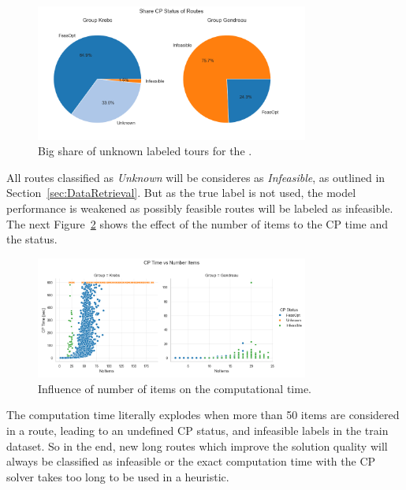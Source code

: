 \begin{figure}[ht]
    \centering
    \includegraphics[width=0.8\textwidth]{pictures/comparison_krebs_gendreau/pie_chart_share_cp_status.png}
    \caption{Big share of unknown labeled tours for the \krebsADataSet.}
    \label{fig:comparison_krebs_gendreau_piechart}
\end{figure}
All routes classified as \textit{Unknown} will be consideres as \textit{Infeasible}, as outlined in Section~\ref{sec:DataRetrieval}. But
as the true label is not used, the model performance is weakened as possibly feasible routes will be labeled as infeasible. The
next Figure~\ref{fig:comparison_krebs_gendreau_numberItems} shows the effect of the number of items to the \gls{CP} time and the status.

\begin{figure}[ht]
    \centering
    \includegraphics[width=0.8\textwidth]{pictures/comparison_krebs_gendreau/number_items_cp_status.png}
    \caption{Influence of number of items on the computational time.}
    \label{fig:comparison_krebs_gendreau_numberItems}
\end{figure}

The computation time literally explodes when more than 50 items are considered in a route, leading to an undefined \gls{CP} status, and
infeasible labels in the train dataset. So in the end, new long routes which improve the solution quality will always be classified as infeasible
or the exact computation time with the \gls{CP} solver takes too long to be used in a heuristic.
